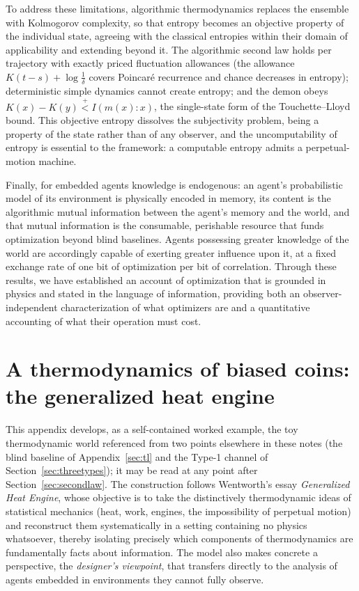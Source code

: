 \documentclass[11pt]{article}
\newcommand{\plt}{\mathrel{\stackrel{+}{<}}}
\begin{document}
To address these limitations, algorithmic thermodynamics replaces the ensemble with Kolmogorov complexity, so that entropy becomes an objective property of the individual state, agreeing with the classical entropies within their domain of applicability and extending beyond it. The algorithmic second law holds per trajectory with exactly priced fluctuation allowances (the allowance $K(t-s) + \log\frac1\delta$ covers Poincar\'e recurrence and chance decreases in entropy); deterministic simple dynamics cannot create entropy; and the demon obeys $K(x) - K(y) \plt I(m(x):x)$, the single-state form of the Touchette--Lloyd bound. This objective entropy dissolves the subjectivity problem, being a property of the state rather than of any observer, and the uncomputability of entropy is essential to the framework: a computable entropy admits a perpetual-motion machine.

Finally, for embedded agents knowledge is endogenous: an agent's probabilistic model of its environment is physically encoded in memory, its content is the algorithmic mutual information between the agent's memory and the world, and that mutual information is the consumable, perishable resource that funds optimization beyond blind baselines. Agents possessing greater knowledge of the world are accordingly capable of exerting greater influence upon it, at a fixed exchange rate of one bit of optimization per bit of correlation. Through these results, we have established an account of optimization that is grounded in physics and stated in the language of information, providing both an observer-independent characterization of what optimizers are and a quantitative accounting of what their operation must cost.

\appendix
\section{A thermodynamics of biased coins: the generalized heat engine}
\label{sec:coins}

This appendix develops, as a self-contained worked example, the toy thermodynamic world referenced from two points elsewhere in these notes (the blind baseline of Appendix~\ref{sec:tl} and the Type-1 channel of Section~\ref{sec:threetypes}); it may be read at any point after Section~\ref{sec:secondlaw}. The construction follows Wentworth's essay \emph{Generalized Heat Engine}, whose objective is to take the distinctively thermodynamic ideas of statistical mechanics (heat, work, engines, the impossibility of perpetual motion) and reconstruct them systematically in a setting containing no physics whatsoever, thereby isolating precisely which components of thermodynamics are fundamentally facts about information. The model also makes concrete a perspective, the \emph{designer's viewpoint}, that transfers directly to the analysis of agents embedded in environments they cannot fully observe.
\end{document}
